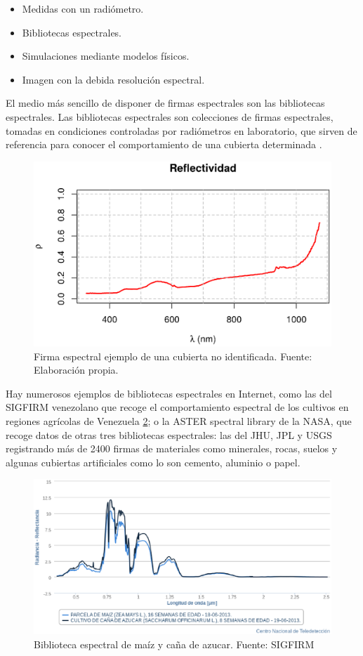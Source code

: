 \begin{itemize}
	\item Medidas con un radiómetro.
	\item Bibliotecas espectrales.
	\item Simulaciones mediante modelos físicos.
	\item Imagen con la debida resolución espectral.
\end{itemize}

El medio más sencillo de disponer de firmas espectrales son las bibliotecas espectrales. Las bibliotecas espectrales son colecciones de firmas espectrales, tomadas en condiciones controladas por radiómetros en laboratorio, que sirven de referencia para conocer el comportamiento de una cubierta determinada \citep{andinofase1}.

\begin{figure}
	\centering	
	\includegraphics[width=0.7\linewidth]{./Imagenes/Firma_espectral.eps}
	\caption[Firma espectral ejemplo]{Firma espectral ejemplo de una cubierta no identificada. Fuente: Elaboración propia.}
	\label{fig:firma}
\end{figure}

Hay numerosos ejemplos de bibliotecas espectrales en Internet, como las del \ac{SIGFIRM} venezolano que recoge el comportamiento espectral de los cultivos en regiones agrícolas de Venezuela \ref{fig:biblioteca_esp}; o la ASTER spectral library de la NASA, que recoge datos de otras tres bibliotecas espectrales: las del \ac{JHU}, \ac{JPL} y \ac{USGS} registrando más de 2400 firmas de materiales como minerales, rocas, suelos y algunas cubiertas artificiales como lo son cemento, aluminio o papel.\Sep

\begin{figure}
	\centering
	\includegraphics[width=0.7\linewidth]{./Imagenes/biblioteca_espectral_SIGFIRM.eps}
	\caption[Biblioteca espectral SIGFIRM]{Biblioteca espectral de maíz y caña de azucar. Fuente: \ac{SIGFIRM}}
	\label{fig:biblioteca_esp}
\end{figure}

